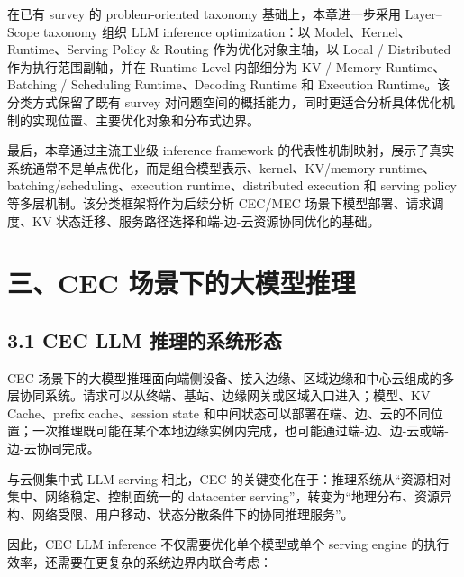 \documentclass[a4paper,10pt]{ctexart}
\begin{document}
在已有 survey 的 problem-oriented taxonomy 基础上，本章进一步采用 Layer–Scope taxonomy 组织 LLM inference optimization：以 Model、Kernel、Runtime、Serving Policy \& Routing 作为优化对象主轴，以 Local / Distributed 作为执行范围副轴，并在 Runtime-Level 内部细分为 KV / Memory Runtime、Batching / Scheduling Runtime、Decoding Runtime 和 Execution Runtime。该分类方式保留了既有 survey 对问题空间的概括能力，同时更适合分析具体优化机制的实现位置、主要优化对象和分布式边界。


最后，本章通过主流工业级 inference framework 的代表性机制映射，展示了真实系统通常不是单点优化，而是组合模型表示、kernel、KV/memory runtime、batching/scheduling、execution runtime、distributed execution 和 serving policy 等多层机制。该分类框架将作为后续分析 CEC/MEC 场景下模型部署、请求调度、KV 状态迁移、服务路径选择和端-边-云资源协同优化的基础。




\section*{三、CEC 场景下的大模型推理}



\subsection*{3.1 CEC LLM 推理的系统形态}



CEC 场景下的大模型推理面向端侧设备、接入边缘、区域边缘和中心云组成的多层协同系统。请求可以从终端、基站、边缘网关或区域入口进入；模型、KV Cache、prefix cache、session state 和中间状态可以部署在端、边、云的不同位置；一次推理既可能在某个本地边缘实例内完成，也可能通过端-边、边-云或端-边-云协同完成。




与云侧集中式 LLM serving 相比，CEC 的关键变化在于：推理系统从“资源相对集中、网络稳定、控制面统一的 datacenter serving”，转变为“地理分布、资源异构、网络受限、用户移动、状态分散条件下的协同推理服务”。




因此，CEC LLM inference 不仅需要优化单个模型或单个 serving engine 的执行效率，还需要在更复杂的系统边界内联合考虑：
\end{document}
